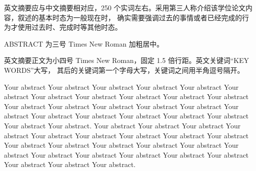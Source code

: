 英文摘要应与中文摘要相对应，250 个实词左右。采用第三人称介绍该学位论文内容，叙述的基本时态为一般现在时，
确实需要强调过去的事情或者已经完成的行为才使用过去时、完成时等其他时态。

ABSTRACT 为三号 Times New Roman 加粗居中。

英文摘要正文为小四号 Times New Roman，固定 1.5 倍行距。英文关键词“KEY WORDS”大写，
其后的关键词第一个字母大写，关键词之间用半角逗号隔开。

Your abstract Your abstract Your abstract Your abstract Your abstract Your abstract Your abstract Your abstract
Your abstract Your abstract Your abstract Your abstract Your abstract Your abstract Your abstract Your abstract
Your abstract Your abstract Your abstract Your abstract Your abstract Your abstract Your abstract Your abstract.
Your abstract Your abstract Your abstract Your abstract Your abstract Your abstract Your abstract Your abstract
Your abstract Your abstract Your abstract Your abstract Your abstract Your abstract Your abstract Your abstract
Your abstract Your abstract Your abstract Your abstract Your abstract Your abstract Your abstract.
